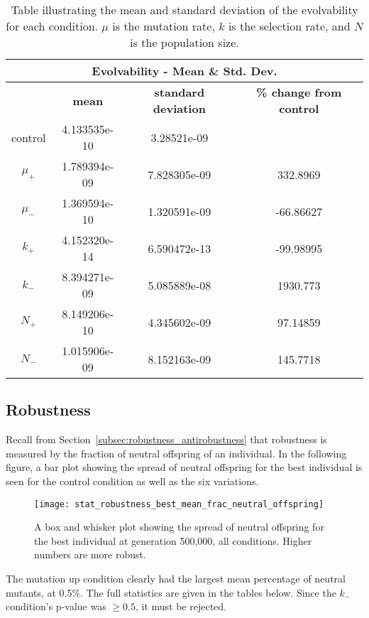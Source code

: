 \begin{table}[H]
	\centering
	\begin{tabular}{| c | c | c | c |}
		\hline
		\multicolumn{4}{c}{\Large Evolvability - Mean \& Std. Dev.} \\
		\hline
		& \textbf{mean} & \textbf{standard deviation} & \textbf{\% change from control} \\
		\hline
		\hline
		control & 4.133535e-10 & 3.28521e-09 & \textemdash \\ 
		\hline
		$\mu_+$ & 1.789394e-09 & 7.828305e-09 & 332.8969 \\ 
		\hline
		$\mu_-$ & 1.369594e-10 & 1.320591e-09 & -66.86627 \\ 
		\hline
		$k_+$ & 4.152320e-14 & 6.590472e-13 & -99.98995 \\ 
		\hline
		$k_-$ & 8.394271e-09 & 5.085889e-08 & 1930.773 \\ 
		\hline
		$N_+$ & 8.149206e-10 & 4.345602e-09 & 97.14859 \\ 
		\hline
		$N_-$ & 1.015906e-09 & 8.152163e-09 & 145.7718 \\ 
		\hline	 		 
	\end{tabular}
	\caption[Evolvability mean and standard deviation]{Table illustrating the mean and standard deviation of the evolvability for each condition. $\mu$ is the mutation rate, $k$ is the selection rate, and $N$ is the population size.}
	\label{table:mean_std_dev_evolvability}
\end{table}

\subsection{Robustness}
Recall from Section~\ref{subsec:robustness_antirobustness} that robustness is measured by the fraction of neutral offspring of an individual. In the following figure, a bar plot showing the spread of neutral offspring for the best individual is seen for the control condition as well as the six variations. 

\begin{figure}[H]
	\centering
	\texttt{[image: stat\_robustness\_best\_mean\_frac\_neutral\_offspring]}
	\caption[Robustness box and whisker plot]{A box and whisker plot showing the spread of neutral offspring for the best individual at generation 500,000, all conditions. Higher numbers are more robust.}
	\label{fig:mean_robustness_all_conditions}
\end{figure}
The mutation up condition clearly had the largest mean percentage of neutral mutants, at 0.5\%. The full statistics are given in the tables below. Since the $k_-$ condition's p-value was $\geq0.5$, it must be rejected.

